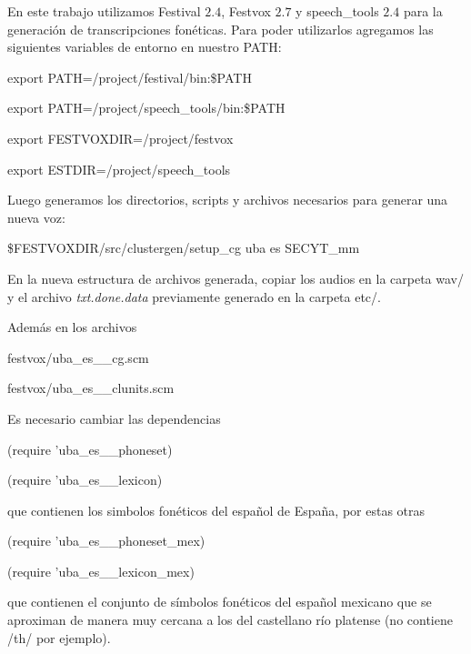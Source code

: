 En este trabajo utilizamos Festival $2.4$\cite{festivalDownload}, Festvox $2.7$\cite{festvoxDownload} y speech\_tools $2.4$\cite{speechToolDownload} para la generación de transcripciones fonéticas. Para poder utilizarlos agregamos las siguientes variables de entorno en nuestro PATH:

\begin{tcolorbox}
export PATH=/project/festival/bin:\$PATH

export PATH=/project/speech\_tools/bin:\$PATH

export FESTVOXDIR=/project/festvox

export ESTDIR=/project/speech\_tools
\end{tcolorbox}

Luego generamos los directorios, scripts y archivos necesarios para generar una nueva voz:
\begin{tcolorbox}
\$FESTVOXDIR/src/clustergen/setup\_cg uba es SECYT\_mm
\end{tcolorbox}

En la nueva estructura de archivos generada, copiar los audios en la carpeta wav/ y el archivo \textit{txt.done.data} previamente generado en la carpeta etc/.

Además en los archivos 

\begin{tcolorbox}
festvox/uba\_es\_\_cg.scm 

festvox/uba\_es\_\_clunits.scm
\end{tcolorbox}

Es necesario cambiar las dependencias 

\begin{tcolorbox}
(require 'uba\_es\_\_phoneset)

(require 'uba\_es\_\_lexicon)
\end{tcolorbox}

que contienen los simbolos fonéticos del español de España, por estas otras

\begin{tcolorbox}
(require 'uba\_es\_\_phoneset\_mex)

(require 'uba\_es\_\_lexicon\_mex)
\end{tcolorbox}

que contienen el conjunto de símbolos fonéticos del español mexicano que se aproximan de manera muy cercana a los del castellano río platense (no contiene /th/ por ejemplo).

